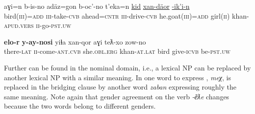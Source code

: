 \documentclass[output=paper]{LSP/langsci}
\begin{document}
\begin{exe}
	\ex	\label{ex:15ab}
	\begin{xlist}
		\ex	\label{ex:15a}
		\gll	aɣi=n   		b-is-no    		adäz=gon  	b-oc’-no    		t’eka=n \underline{kid}  	\underline{xan-däor}   		\underline{-ik’i-n}\\
			bird(\textsc{iii})=\textsc{add} 	\textsc{iii}-take-\textsc{cvb}  	ahead=\textsc{cntr} 	\textsc{iii}-drive-\textsc{cvb}  	he.goat(\textsc{iii})=\textsc{add} girl(\textsc{ii}) 	khan-\textsc{apud.vers} 	\textsc{ii}-go-\textsc{pst.uw} \\
		\glt	{}

		\ex	\label{ex:15b}
		\gll			\textbf{elo-r}    	\textbf{y-ay-nosi}   			yiɬa    			xan-qor      		aɣi teƛ-xo    			zow-no \\
			there-\textsc{lat}	\textsc{ii}-come-\textsc{ant.cvb} 	she.\textsc{obl.erg}  	khan-\textsc{at.lat} 	bird give-\textsc{icvb}  		be\textsc{-pst.uw}   \\
		\glt	{}
	\end{xlist}
\end{exe}

Further  can be found in the nominal domain, i.e., a lexical NP can be replaced by another lexical NP with a similar meaning. In  one word to express , \textit{meχ}, is replaced in the bridging clause by another word \textit{zaban} expressing roughly the same meaning. Note again that gender agreement on the verb \textit{-e͂ƛe}  changes because the two words belong to different genders. 
\end{document}
